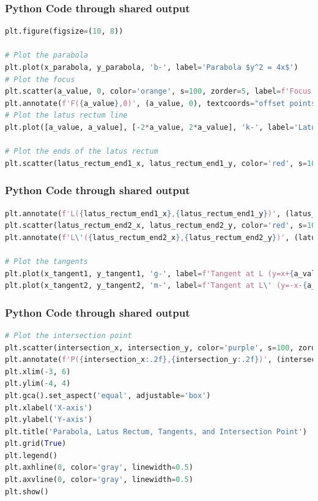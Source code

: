 \documentclass{beamer}
\begin{document}
\begin{frame}[fragile]
\frametitle{Python Code through shared output}
\begin{lstlisting}[language=Python]
plt.figure(figsize=(10, 8))

# Plot the parabola
plt.plot(x_parabola, y_parabola, 'b-', label='Parabola $y^2 = 4x$')
# Plot the focus
plt.scatter(a_value, 0, color='orange', s=100, zorder=5, label=f'Focus ({a_value}, 0)')
plt.annotate(f'F({a_value},0)', (a_value, 0), textcoords="offset points", xytext=(5,5), ha='left')
# Plot the latus rectum line
plt.plot([a_value, a_value], [-2*a_value, 2*a_value], 'k-', label='Latus Rectum (x=1)')

# Plot the ends of the latus rectum
plt.scatter(latus_rectum_end1_x, latus_rectum_end1_y, color='red', s=100, zorder=5, label=f'End L ({latus_rectum_end1_x},{latus_rectum_end1_y})')
\end{lstlisting}
\end{frame}

\begin{frame}[fragile]
\frametitle{Python Code through shared output}
\begin{lstlisting}[language=Python]
plt.annotate(f'L({latus_rectum_end1_x},{latus_rectum_end1_y})', (latus_rectum_end1_x, latus_rectum_end1_y), textcoords="offset points", xytext=(5,5), ha='left')
plt.scatter(latus_rectum_end2_x, latus_rectum_end2_y, color='red', s=100, zorder=5, label=f'End L\' ({latus_rectum_end2_x},{latus_rectum_end2_y})')
plt.annotate(f'L\'({latus_rectum_end2_x},{latus_rectum_end2_y})', (latus_rectum_end2_x, latus_rectum_end2_y), textcoords="offset points", xytext=(5,5), ha='right')

# Plot the tangents
plt.plot(x_tangent1, y_tangent1, 'g-', label=f'Tangent at L (y=x+{a_value})')
plt.plot(x_tangent2, y_tangent2, 'm-', label=f'Tangent at L\' (y=-x-{a_value})')
\end{lstlisting}
\end{frame}

\begin{frame}[fragile]
\frametitle{Python Code through shared output}
\begin{lstlisting}[language=Python]
# Plot the intersection point
plt.scatter(intersection_x, intersection_y, color='purple', s=100, zorder=6, label=f'Intersection ({intersection_x:.2f},{intersection_y:.2f})')
plt.annotate(f'P({intersection_x:.2f},{intersection_y:.2f})', (intersection_x, intersection_y), textcoords="offset points", xytext=(10, -15), ha='left', color='purple', fontsize=12)
plt.xlim(-3, 6)
plt.ylim(-4, 4)
plt.gca().set_aspect('equal', adjustable='box')
plt.xlabel('X-axis')
plt.ylabel('Y-axis')
plt.title('Parabola, Latus Rectum, Tangents, and Intersection Point')
plt.grid(True)
plt.legend()
plt.axhline(0, color='gray', linewidth=0.5)
plt.axvline(0, color='gray', linewidth=0.5)
plt.show()
\end{lstlisting}
\end{frame}
\end{document}
